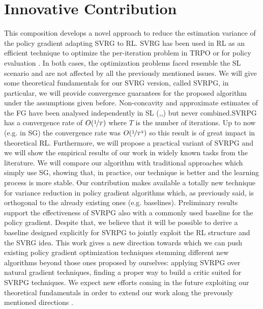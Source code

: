 \section{Innovative Contribution}
This composition develops a novel approach to reduce the estimation variance of the policy gradient adapting \acs{SVRG} to \acs{RL}.\newline 
\acs{SVRG} has been used in \acs{RL} as an efficient technique to optimize the per-iteration problem in \ac{TRPO} \citep{xu2017stochastic} or for policy evaluation \citep{du2017stochastic}. In both cases, the optimization problems faced resemble the \acs{SL} scenario and are not affected by all the previously mentioned issues.
We will give some theoretical fundamentals for our \acs{SVRG} version, called \acs{SVRPG}, in particular, we will provide convergence guarantees for the proposed algorithm under the assumptions given before. Non-concavity and approximate estimates of the \acs{FG} have been analysed independently in \acs{SL} (\cite{allen2016variance},\cite{reddi2016stochastic},\cite{harikandeh2015stopwasting}) but never combined.\newline \acs{SVRPG} has a convergence rate of $O(\nicefrac{1}{T})$ where $T$ is the number of iterations. Up to now (e.g. in \acs{SG}) the convergence rate was  $O(\nicefrac{1}{T^2})$ so this result is of great impact in theoretical \acs{RL}.\newline
 Furthermore, we will propose a practical variant of \acs{SVRPG} and we will show the empirical results of our work in widely known tasks from the literature. We will compare our algorithm with traditional approaches which simply use \acs{SG}, showing that, in practice, our technique is better and the learning process is more stable.\newline
Our contribution makes available a totally new technique for variance reduction in policy gradient algorithms which, as previously said, is orthogonal to the already existing ones (e.g. baselines).
Preliminary results support the effectiveness of \acs{SVRPG} also with a commonly used baseline for the policy gradient. Despite that, we believe that it will be possible to derive a baseline designed explicitly for \acs{SVRPG} to jointly exploit the \acs{RL} structure and the \acs{SVRG} idea.\newline
This work gives a new direction towards which we can push existing policy gradient optimization techniques stemming different new algorithms beyond those ones proposed by ourselves: applying \acs{SVRPG} over natural gradient techniques, finding a proper way to build a critic suited for \acs{SVRPG} techniques. We expect new efforts coming in the future exploiting our theoretical fundamentals in order to extend our work along the prevously mentioned directions .\newline
